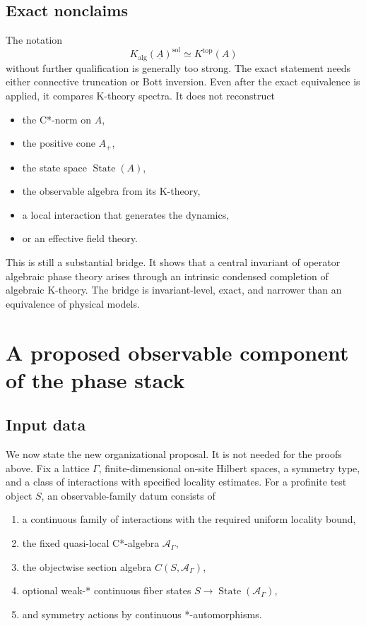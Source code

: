 \documentclass[12pt]{article}
\theoremstyle{definition}
\theoremstyle{remark}
\newcommand{\A}{\mathcal A}
\newcommand{\Kalg}{K_{\mathrm{alg}}}
\newcommand{\Ktop}{K^{\mathrm{top}}}
\newcommand{\State}{\operatorname{State}}
\begin{document}
\subsection{Exact nonclaims}

The notation
\[
\Kalg(\underline A)^{\mathrm{sol}}
\simeq
\Ktop(A)
\]
without further qualification is generally too strong.  The exact statement needs
either connective truncation or Bott inversion.  Even after the exact equivalence is
applied, it compares K-theory spectra.  It does not reconstruct

\begin{itemize}[leftmargin=2em]
\item the C*-norm on $A$,
\item the positive cone $A_+$,
\item the state space $\State(A)$,
\item the observable algebra from its K-theory,
\item a local interaction that generates the dynamics,
\item or an effective field theory.
\end{itemize}

This is still a substantial bridge.  It shows that a central invariant of operator
algebraic phase theory arises through an intrinsic condensed completion of algebraic
K-theory.  The bridge is invariant-level, exact, and narrower than an equivalence of
physical models.

\section{A proposed observable component of the phase stack}

\subsection{Input data}

We now state the new organizational proposal.  It is not needed for the proofs above.
Fix a lattice $\Gamma$, finite-dimensional on-site Hilbert spaces, a symmetry type,
and a class of interactions with specified locality estimates.  For a profinite test
object $S$, an observable-family datum consists of

\begin{enumerate}[leftmargin=2em]
\item a continuous family of interactions with the required uniform locality bound,
\item the fixed quasi-local C*-algebra $\A_\Gamma$,
\item the objectwise section algebra $C(S,\A_\Gamma)$,
\item optional weak-* continuous fiber states $S\to\State(\A_\Gamma)$,
\item and symmetry actions by continuous *-automorphisms.
\end{enumerate}
\end{document}
